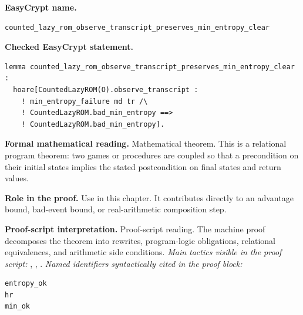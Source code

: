 \begin{formaltheorem}
\noindent\textbf{EasyCrypt name.}
\begin{lstlisting}[language=EasyCrypt,basicstyle=\ttfamily\scriptsize]
counted_lazy_rom_observe_transcript_preserves_min_entropy_clear
\end{lstlisting}
\noindent\textbf{Checked EasyCrypt statement.}
\begin{lstlisting}[language=EasyCrypt,basicstyle=\ttfamily\scriptsize]
lemma counted_lazy_rom_observe_transcript_preserves_min_entropy_clear :
  hoare[CountedLazyROM(O).observe_transcript :
    ! min_entropy_failure md tr /\
    ! CountedLazyROM.bad_min_entropy ==>
    ! CountedLazyROM.bad_min_entropy].
\end{lstlisting}
\noindent\textbf{Formal mathematical reading.}
Mathematical theorem. This is a relational program theorem: two games or procedures are coupled so that a precondition on their initial states implies the stated postcondition on final states and return values.

\noindent\textbf{Role in the proof.}
Use in this chapter. It contributes directly to an advantage bound, bad-event bound, or real-arithmetic composition step.

\noindent\textbf{Proof-script interpretation.}
Proof-script reading. The machine proof decomposes the theorem into rewrites, program-logic obligations, relational equivalences, and arithmetic side conditions.
\emph{Main tactics visible in the proof script:} \ec{proc}, \ec{wp}, \ec{rewrite}.
\emph{Named identifiers syntactically cited in the proof block:}
\begin{lstlisting}[language=EasyCrypt,basicstyle=\ttfamily\scriptsize]
entropy_ok
hr
min_ok
\end{lstlisting}

\end{formaltheorem}

